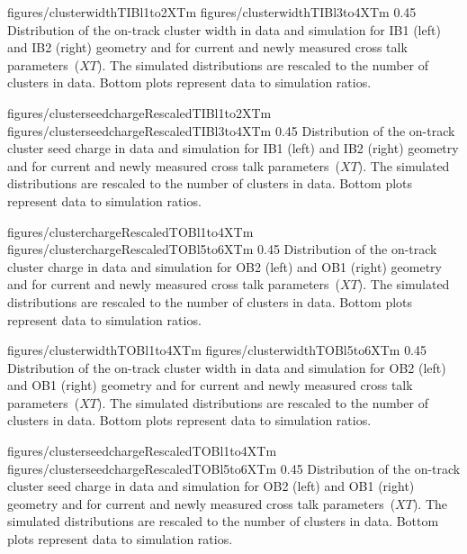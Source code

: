                  {figures/clusterwidthTIBl1to2XTm}
                 {figures/clusterwidthTIBl3to4XTm}
                 {0.45}       %
                 { Distribution of the on-track cluster width in data and simulation for IB1 (left) and IB2 (right) geometry and for current and newly measured cross talk parameters~($XT$).  The simulated distributions are rescaled to the number of clusters in data.  Bottom plots represent data to simulation ratios. }

                 {figures/clusterseedchargeRescaledTIBl1to2XTm} %
                 {figures/clusterseedchargeRescaledTIBl3to4XTm} %
                 {0.45}       %
                 { Distribution of the on-track cluster seed charge in data and simulation for IB1 (left) and IB2 (right) geometry and for current and newly measured cross talk parameters~($XT$).  The simulated distributions are rescaled to the number of clusters in data.  Bottom plots represent data to simulation ratios. }


                 {figures/clusterchargeRescaledTOBl1to4XTm} %
                 {figures/clusterchargeRescaledTOBl5to6XTm} %
                 {0.45}       %
                 { Distribution of the on-track cluster charge in data and simulation for OB2 (left) and OB1 (right) geometry and for current and newly measured cross talk parameters~($XT$).  The simulated distributions are rescaled to the number of clusters in data.  Bottom plots represent data to simulation ratios. }

                 {figures/clusterwidthTOBl1to4XTm}
                 {figures/clusterwidthTOBl5to6XTm}
                 {0.45}       %
                 { Distribution of the on-track cluster width in data and simulation for OB2 (left) and OB1 (right) geometry and for current and newly measured cross talk parameters~($XT$).  The simulated distributions are rescaled to the number of clusters in data.  Bottom plots represent data to simulation ratios. }

                 {figures/clusterseedchargeRescaledTOBl1to4XTm} %
                 {figures/clusterseedchargeRescaledTOBl5to6XTm} %
                 {0.45}       %
                 { Distribution of the on-track cluster seed charge in data and simulation for OB2 (left) and OB1 (right) geometry and for current and newly measured cross talk parameters~($XT$).  The simulated distributions are rescaled to the number of clusters in data.  Bottom plots represent data to simulation ratios. }

